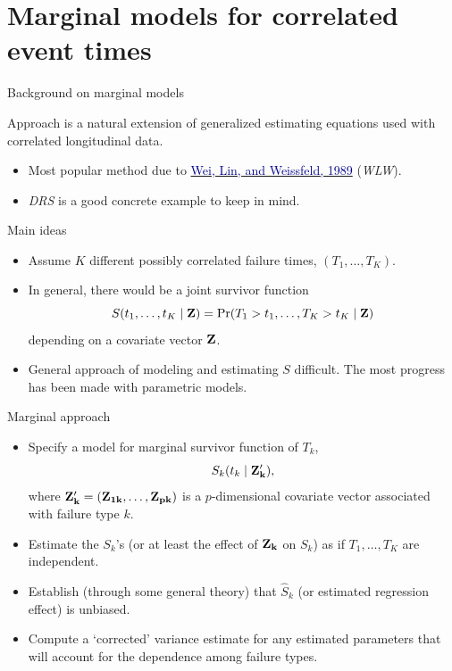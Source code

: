 \documentclass[ignorenonframetext,]{beamer}
\newcommand{\bZ}{\bf Z}
\begin{document}
\hypertarget{marginal-models-for-correlated-event-times}{%
\section{Marginal models for correlated event
times}\label{marginal-models-for-correlated-event-times}}

\begin{frame}{%
\protect\hypertarget{background-on-marginal-models}{%
Background on marginal models}}

Approach is a natural extension of generalized estimating equations used
with correlated longitudinal data.

\begin{itemize}
\item
  Most popular method due to
  \href{../../methods_papers/wlw.pdf}{\textcolor{darkblue}{Wei, Lin, and Weissfeld, 1989}}
  (\emph{WLW}).
\item
  \emph{DRS} is a good concrete example to keep in mind.
\end{itemize}

Main ideas

\begin{itemize}
\item
  Assume \(K\) different possibly correlated failure times,
  \((T_1,\ldots, T_K)\).
\item
  In general, there would be a joint survivor function \[
        S(t_1, \ldots, t_K \mid {\bf Z}) 
            = \Pr (T_1 > t_1,\dots,T_K > t_K \mid {\bf Z})
    \] depending on a covariate vector \({\bf Z}\).
\item
  General approach of modeling and estimating \(S\) difficult. The most
  progress has been made with parametric models.
\end{itemize}

\end{frame}

\begin{frame}{%
\protect\hypertarget{marginal-approach}{%
Marginal approach}}

\begin{itemize}
\item
  Specify a model for marginal survivor function of \(T_k\), \[  
        S_k(t_k \mid \bZ_k^\prime),
    \] where \(\bZ_k^\prime = (Z_{1k},\dots,Z_{pk})\) is a
  \(p\)-dimensional covariate vector associated with failure type \(k\).
\item
  Estimate the \(S_k\)’s (or at least the effect of \(\bZ_k\) on
  \(S_k\)) as if \(T_1, \dots, T_K\) are independent.
\item
  Establish (through some general theory) that \(\widehat{S}_k\) (or
  estimated regression effect) is unbiased.
\item
  Compute a `corrected’ variance estimate for any estimated parameters
  that will account for the dependence among failure types.
\end{itemize}

\end{frame}
\end{document}
